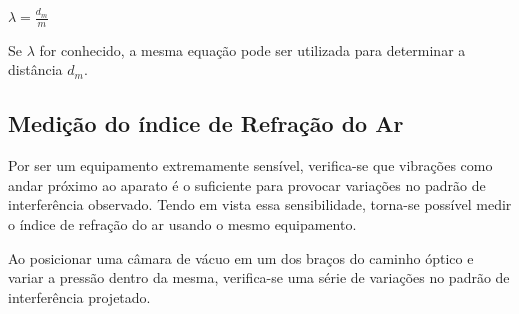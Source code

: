 $\lambda =  \frac{d_{m}}{m}$

	Se $\lambda$ for conhecido, a mesma equação pode ser utilizada para determinar a distância $d_{m}$.

\subsection{Medição do índice de Refração do Ar}

	Por ser um equipamento extremamente sensível, verifica-se que vibrações como andar próximo ao aparato é o suficiente para provocar variações no padrão de interferência observado. Tendo em vista essa sensibilidade, torna-se possível medir o índice de refração do ar usando o mesmo equipamento.

	Ao posicionar uma câmara de vácuo em um dos braços do caminho óptico e variar a pressão dentro da mesma, verifica-se uma série de variações no padrão de interferência projetado.

